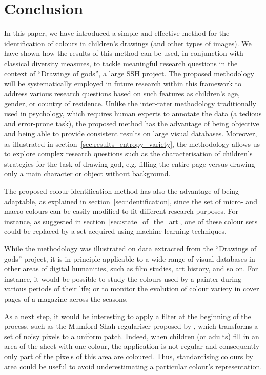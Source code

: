 \documentclass[11pt,a4paper]{article}
\begin{document}
\section{Conclusion}
\label{sec:conclusion}
In this paper, we have introduced a simple and effective method for the identification of colours in children's drawings (and other types of images). We have shown how the results of this method can be used, in conjunction with classical diversity measures, to tackle meaningful research questions in the context of ``Drawings of gods'', a large SSH project. The proposed methodology will be systematically employed in future research within this framework to address various research questions based on such features as children's age, gender, or country of residence. Unlike the inter-rater methodology traditionally used in psychology, which requires human experts to annotate the data (a tedious and error-prone task), the proposed method has the advantage of being objective and being able to provide consistent results on large visual databases. Moreover, as illustrated in section~\ref{sec:results_entropy_variety}, the methodology allows us to explore complex research questions such as the characterisation of children's strategies for the task of drawing god, e.g. filling the entire page versus drawing only a main character or object without background.

The proposed colour identification method has also the advantage of being adaptable, as explained in section~\ref{sec:identification}, since the set of micro- and macro-colours can be easily modified to fit different research purposes. For instance, as suggested in section~\ref{sec:state_of_the_art}, one of these colour sets could be replaced by a set acquired using machine learning techniques.

While the methodology was illustrated on data extracted from the ``Drawings of gods'' project, it is in principle applicable to a wide range of visual databases in other areas of digital humanities, such as film studies, art history, and so on.
For instance, it would be possible to study the colours used by a painter during various periods of their life; or to monitor the evolution of colour variety in cover pages of a magazine across the seasons.

As a next step, it would be interesting to apply a filter at the beginning of the process, such as the Mumford-Shah regulariser proposed by \citet{erdem2009}, which transforms a set of noisy pixels to a uniform patch. Indeed, when children (or adults) fill in an area of the sheet with one colour, the application is not regular and consequently only part of the pixels of this area are coloured. Thus, standardising colours by area could be useful to avoid underestimating a particular colour's representation.
\end{document}
